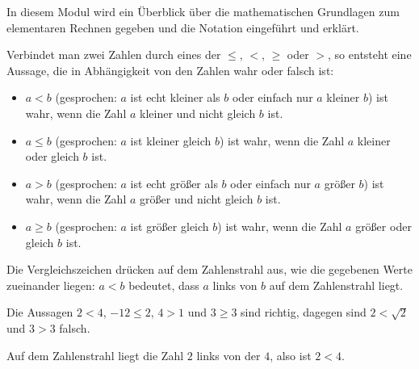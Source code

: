 

\Mtikzexternalize




\begin{MSectionStart}

\MModstartBox

In diesem Modul wird ein Überblick über die mathematischen Grundlagen zum elementaren Rechnen gegeben und die Notation eingeführt und erklärt.
\end{MSectionStart}


\begin{MIntro}

\begin{MInfo}
Verbindet man zwei Zahlen durch eines der  $\leq$, $<$, $\geq$ oder $>$, so entsteht eine Aussage, die in Abhängigkeit von
den Zahlen wahr oder falsch ist:
\begin{itemize}
\item{$a<b$ (gesprochen: $a$ ist echt kleiner als $b$ oder einfach nur $a$ kleiner $b$) ist wahr, wenn die Zahl $a$ kleiner und nicht gleich $b$ ist.}
\item{$a \leq b$ (gesprochen: $a$ ist kleiner gleich $b$) ist wahr, wenn die Zahl $a$ kleiner oder gleich $b$ ist.}
\item{$a>b$ (gesprochen: $a$ ist echt größer als $b$ oder einfach nur $a$ größer $b$) ist wahr, wenn die Zahl $a$ größer und nicht gleich $b$ ist.}
\item{$a \geq b$ (gesprochen: $a$ ist größer gleich $b$) ist wahr, wenn die Zahl $a$ größer oder gleich $b$ ist.}
\end{itemize}
\end{MInfo}

Die Vergleichszeichen drücken auf dem Zahlenstrahl aus, wie die gegebenen Werte zueinander liegen: $a<b$ bedeutet, dass $a$ links von $b$ auf dem Zahlenstrahl liegt.

\begin{MExample}
Die Aussagen $2<4$, $-12\leq 2$, $4>1$ und $3\geq 3$ sind richtig, dagegen sind $2<\sqrt2$ und $3>3$ falsch.

\begin{center}
%
Auf dem Zahlenstrahl liegt die Zahl $2$ links von der $4$, also ist $2<4$.
\end{center}


\end{MExample}
\end{MIntro}
